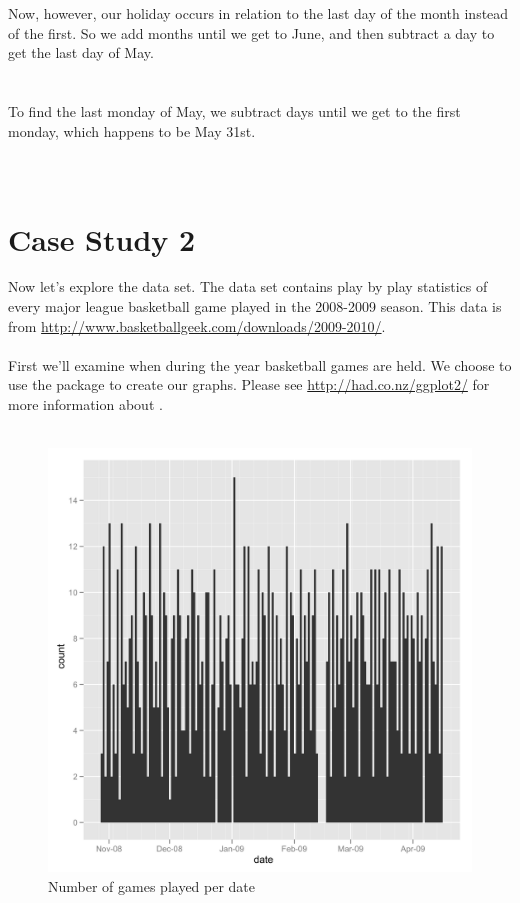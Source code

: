 \documentclass[article]{jss}
\begin{document}
Now, however, our holiday occurs in relation to the last day of the month instead of the first. So we add months until we get to June, and then subtract a day to get the last day of May.\\

\\
\\

To find the last monday of May, we subtract days until we get to the first monday, which happens to be May 31st.\\

\\
\\


\section{Case Study 2}
Now let's explore the  data set. The  data set contains play by play statistics of every major league basketball game played in the 2008-2009 season. This data is from \url{http://www.basketballgeek.com/downloads/2009-2010/}. \\

\\

First we'll examine when during the year basketball games are held. We choose to use the  package to create our graphs. Please see \url{http://had.co.nz/ggplot2/} for more information about .\\

\\

\begin{figure}[htpb]
  \centering
  \includegraphics[width=.5\textwidth]{game-dates-histogram.png}        
  \caption{Number of games played per date}
  \label{fig:games-date}
\end{figure}
\end{document}
